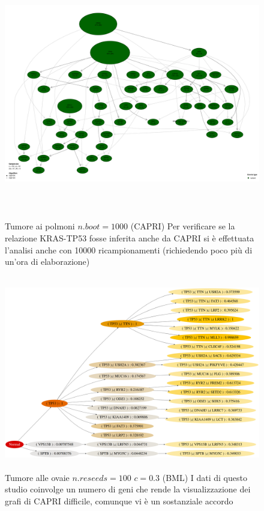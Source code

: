 \documentclass[a4paper]{article}
\begin{document}
	\begin{figure}[H]
	  \centering
	  \includegraphics[height=11cm, keepaspectratio]{Lung_SM4_capri.png}%
	  \captionsetup{justification=centering,margin=0.5cm}
	  \caption{Tumore ai polmoni $n.boot=1000$ (CAPRI) Per verificare se la relazione KRAS-TP53 fosse inferita anche da CAPRI si è effettuata l'analisi anche con 10000 ricampionamenti
			(richiedendo poco più di un'ora di elaborazione)} 
	\end{figure}

	\begin{figure}[H]
	  \centering
	  \includegraphics[height=8.5cm, keepaspectratio]{OV_SM5.png}%
	  \captionsetup{justification=centering,margin=0.5cm}
	  \caption{Tumore alle ovaie $n.reseeds=100$ $c=0.3$ (BML) I dati di questo studio coinvolge un numero di geni che rende la visualizzazione dei grafi di CAPRI difficile,
	 	   comunque vi è un sostanziale accordo} 
	\end{figure}
\end{document}
